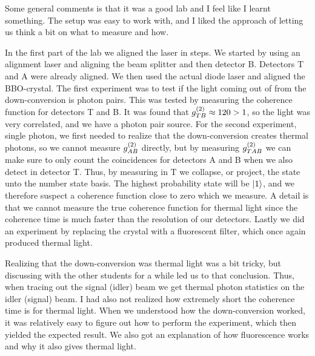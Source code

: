 Some general comments is that it was a good lab and I feel like I learnt something. The setup was easy to work with, and I liked the approach of letting us think a bit on what to measure and how. 

In the first part of the lab we aligned the laser in steps. We started by using an alignment laser and aligning the beam splitter and then detector B. Detectors T and A were already aligned. We then used the actual diode laser and aligned the BBO-crystal. The first experiment was to test if the light coming out of from the down-conversion is photon pairs. This was tested by measuring the coherence function for detectors T and B. It was found that $g^{(2)}_{TB} \approx 120 > 1$, so the light was very correlated, and we have a photon pair source. For the second experiment, single photon, we first needed to realize that the down-conversion creates thermal photons, so we cannot measure $g^{(2)}_{AB}$ directly, but by measuring $g^{(2)}_{TAB}$ we can make sure to only count the coincidences for detectors A and B when we also detect in detector T. Thus, by measuring in T we collapse, or project, the state unto the number state basis. The highest probability state will be $\ket{1}$, and we therefore suspect a coherence function close to zero which we measure. A detail is that we cannot measure the true coherence function for thermal light since the coherence time is much faster than the resolution of our detectors. Lastly we did an experiment by replacing the crystal with a fluorescent filter, which once again produced thermal light.

Realizing that the down-conversion was thermal light was a bit tricky, but discussing with the other students for a while led us to that conclusion. Thus, when tracing out the signal (idler) beam we get thermal photon statistics on the idler (signal) beam. I had also not realized how extremely short the coherence time is for thermal light. When we understood how the down-conversion worked, it was relatively easy to figure out how to perform the experiment, which then yielded the expected result. We also got an explanation of how fluorescence works and why it also gives thermal light. 